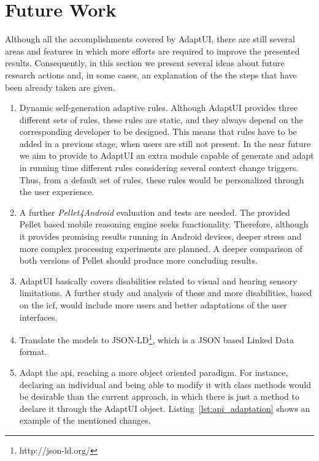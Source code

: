 \section{Future Work}
\label{sec:future_work}

Although all the accomplishments covered by AdaptUI, there are still several 
areas and features in which more efforts are required to improve the presented 
results. Consequently, in this section we present several ideas about future 
research actions and, in some cases, an explanation of the the steps that have 
been already taken are given.

\begin{enumerate}[label=\alph*)]
  \item Dynamic self-generation adaptive rules. Although AdaptUI provides three 
  different sets of rules, these rules are static, and they always depend on 
  the corresponding developer to be designed. This means that rules have to 
  be added in a previous stage, when users are still not present. In the near 
  future we aim to provide to AdaptUI an extra module capable of generate and 
  adapt in running time different rules considering several context change 
  triggers. Thus, from a default set of rules, these rules would be personalized 
  through the user experience.
  
  \item A further \textit{Pellet4Android} evaluation and tests are needed. The
  provided Pellet based mobile reasoning engine seeks functionality. Therefore,
  although it provides promising results running in Android devices, deeper 
  stress and  more complex processing experiments are planned. A deeper
  comparison of both versions of Pellet should produce more concluding results.
  
  \item AdaptUI basically covers disabilities related to visual and hearing
  sensory limitations. A further study and analysis of these and more 
  disabilities, based on the \ac{icf}, would include more users and better 
  adaptations of the user interfaces.
  
  \item Translate the models to JSON-LD\footnote{http://json-ld.org/}, which is
  a JSON based Linked Data format.
  
  \item Adapt the \ac{api}, reaching a more object oriented paradigm. For instance,
  declaring an individual and being able to modify it with class methods would 
  be desirable than the current approach, in which there is just a method to
  declare it through the AdaptUI object. Listing~\ref{lst:api_adaptation} shows
  an example of the mentioned changes.
  

\end{enumerate}
